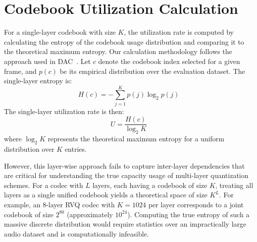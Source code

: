 \documentclass[11pt]{article}
\begin{document}

\section{Codebook Utilization Calculation}
\label{app:2}

For a single-layer codebook with size $K$, the utilization rate is computed by calculating the entropy of the codebook usage distribution and comparing it to the theoretical maximum entropy. Our calculation methodology follows the approach used in DAC~\cite{kumar2023high}. Let $c$ denote the codebook index selected for a given frame, and $p(c)$ be its empirical distribution over the evaluation dataset. The single-layer entropy is:
\begin{equation}
H(c) = -\sum_{j=1}^{K} p(j) \log_2 p(j)
\end{equation}
The single-layer utilization rate is then:
\begin{equation}
U = \frac{H(c)}{\log_2 K}
\end{equation}
where $\log_2 K$ represents the theoretical maximum entropy for a uniform distribution over $K$ entries.

However, this layer-wise approach fails to capture inter-layer dependencies that are critical for understanding the true capacity usage of multi-layer quantization schemes. For a codec with $L$ layers, each having a codebook of size $K$, treating all layers as a single unified codebook yields a theoretical space of size $K^L$. For example, an 8-layer RVQ codec with $K=1024$ per layer corresponds to a joint codebook of size $2^{80}$ (approximately $10^{24}$). Computing the true entropy of such a massive discrete distribution would require statistics over an impractically large audio dataset and is computationally infeasible.
\end{document}
